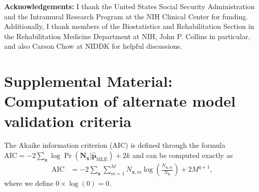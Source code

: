 \documentclass[prl,twocolumn,groupedaddress]{revtex4-1}
\newcommand{\bN}{\mathbf{N}}
\newcommand{\bx}{\mathbf{x}}
\newcommand{\bp}{\mathbf{p}}
\begin{document}
\textbf{Acknowledgements:} I thank the United States Social Security Administration and the Intramural Research Program at the NIH Clinical Center for funding. Additionally, I thank members of the Biostatistics and Rehabilitation Section in the Rehabilitation Medicine Department at NIH, John P. Collins in particular, and also Carson Chow at NIDDK for helpful discussions.




\clearpage
\newpage
\appendix

\section{Supplemental Material: Computation of alternate model validation criteria}


The Akaike information criterion (AIC) is defined through the formula $\textrm{AIC}  = -2 \sum_{\bx}\log \Pr(\bN_\bx \vert \hat{\bp}_{\textrm{MLE}}) + 2k$ and can be computed exactly as
\begin{align}
\textrm{AIC}  &= -2\sum_{\bx}\sum_{m=1}^M N_{\bx,m}\log \left( \frac{N_{\bx,m}}{N_\bx} \right)+ 2M^{q+1},
\end{align}
where we define $0\times\log(0)=0$.
\end{document}
